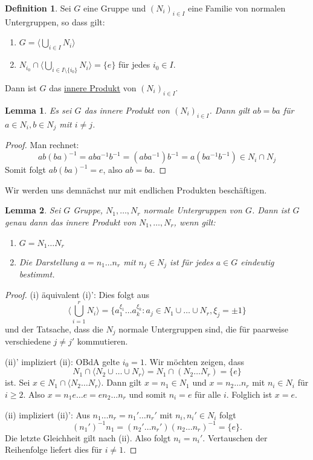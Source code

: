 \documentclass[12pt]{scrartcl} %
\newcommand{\inv}[1]{\left(#1\right)^{-1}}
\newcommand{\Inv}[1]{#1^{-1}}
\newtheorem{lemma}{Lemma}
\theoremstyle{definition}
\newtheorem*{defn}{Definition}
\theoremstyle{remark}
\begin{document}
\begin{defn}
	Sei $G$ eine Gruppe und $(N_i)_{i\in I}$ eine Familie von normalen Untergruppen, so dass gilt:
	\begin{enumerate}[label=(\roman*)]
		\item $G=\langle\bigcup_{i\in I} N_i\rangle$
		\item $N_{i_0} \cap \langle\bigcup_{i\in I \setminus \{i_0\}} N_i\rangle = \{e\}$ für jedes $i_0\in I$.
	\end{enumerate}
	Dann ist $G$ das \underline{innere Produkt} von $(N_i)_{i\in I}$.
\end{defn}

\begin{lemma}
	Es sei $G$ das innere Produkt von $(N_i)_{i\in I}$.
	Dann gilt $ab=ba$ für $a\in N_i, b\in N_j$ mit $i\neq j$.
\end{lemma}

\begin{proof}
	Man rechnet: $$ab\inv{ba}=ab\Inv{a}\Inv{b}=(ab\Inv{a})\Inv{b}=a(b\Inv{a}\Inv{b}) \in N_i\cap N_j$$
	Somit folgt $ab\inv{ba}=e$, also $ab=ba$.
\end{proof}

Wir werden uns demnächst nur mit endlichen Produkten beschäftigen.

\begin{lemma}
	Sei $G$ Gruppe, $N_1,\dots,N_r$ normale Untergruppen von $G$.
	Dann ist $G$ genau dann das innere Produkt von $N_1,\dots,N_r$, wenn gilt:
	\begin{enumerate}[label=(\roman*)']
		\item $G=N_1\dots N_r$
		\item Die Darstellung $a=n_1\dots n_r$ mit $n_j\in N_j$ ist für jedes $a\in G$ eindeutig bestimmt.
	\end{enumerate}
\end{lemma}

\begin{proof}
	(i) äquivalent (i)': Dies folgt aus $$\langle\bigcup_{i=1}^r N_i\rangle = \{a_1^{\xi_1}\dots a_k^{\xi_k}: a_j\in N_1\cup\dots \cup N_r, \xi_j = \pm 1\}$$ und der Tatsache, dass die $N_j$ normale Untergruppen sind, die für paarweise verschiedene $j\neq j'$ kommutieren.

	(ii)' impliziert (ii): OBdA gelte $i_0=1$.
	Wir möchten zeigen, dass $$N_1\cap \langle N_2\cup\dots \cup N_r\rangle = N_1 \cap (N_2\dots N_r)= \{e\}$$ ist.
	Sei $x\in N_1\cap \langle N_2\dots N_r\rangle$.
	Dann gilt $x=n_1\in N_1$ und $x=n_2\dots n_r$ mit $n_i\in N_i$ für $i\geq 2$.
	Also $x=n_1e\dots e=en_2\dots n_r$ und somit $n_i=e$ für alle $i$.
	Folglich ist $x=e$.

	(ii) impliziert (ii)': Aus $n_1\dots n_r=n_1'\dots n_r'$ mit $n_i,n_i'\in N_i$ folgt $$\inv{n_1'}n_1=(n_2'\dots n_r')\inv{n_2\dots n_r} = \{e\}.$$
	Die letzte Gleichheit gilt nach (ii).
	Also folgt $n_i=n_i'$.
	Vertauschen der Reihenfolge liefert dies für $i\neq 1$.
\end{proof}
\end{document}

